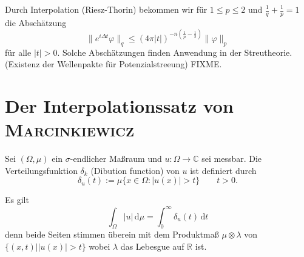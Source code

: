 \documentclass[
paper=a4,
bibtotocnumbered,
liststotocnumbered,
tablecaptionabove,
pointlessnumbers,
twoside,
openright,
10pt
]
{report}
\let\phi\varphi
\theoremstyle{definition}
\numberwithin{equation}{chapter}
\begin{document}
Durch Interpolation (Riesz-Thorin) bekommen wir für $1\le p \le 2$ und $\frac{1}{q}+\frac{1}{p} =1$ die Abschätzung
\begin{equation}
\| e^{i\Delta t}\phi\|_q \le (4\pi |t|)^{-n(\frac{1}{p} - \frac{1}{2})}\| \phi\|_p
\end{equation}
für alle $|t|>0$.  Solche Abschätzungen finden Anwendung in der Streutheorie. (Existenz der Wellenpakte für Potenzialstreeung) FIXME.

\section{Der Interpolationssatz von \textsc{Marcinkiewicz}}

Sei $(\Omega, \mu)$ ein $\sigma$-endlicher Maßraum und $u: \Omega \to \mathbb C$ sei messbar.  Die Verteilungsfunktion $\delta_k$ (Dibution function) von $u$ ist definiert durch
\begin{equation}
\delta_u(t) := \mu\{ x\in \Omega:|u(x)|>t\}\qquad t>0.
\end{equation}

Es gilt
\begin{equation}\label{eq:4.1}
\int_{\Omega} | u| \, \mathrm d\mu = \int_0^\infty \delta_u(t) \, \mathrm dt
\end{equation}
denn beide Seiten stimmen überein mit dem Produktmaß $\mu \otimes \lambda$ von $\{(x,t) | |u(x)|>t\}$ wobei $\lambda$ das Lebesgue auf $\mathbb R$ ist.
\end{document}
